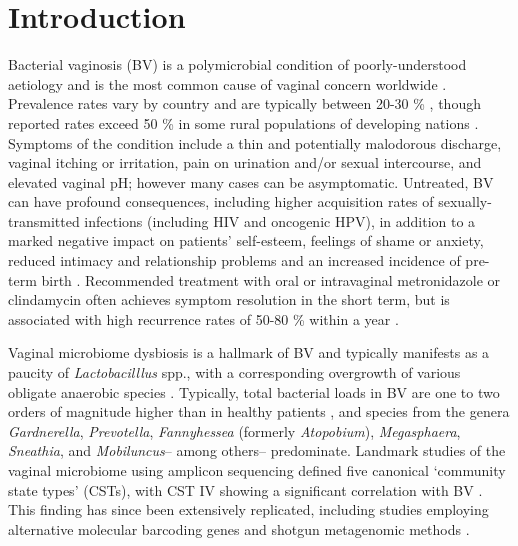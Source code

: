 \documentclass[sn-mathphys,Numbered]{sn-jnl}%
\begin{document}
\section{Introduction}\label{sec:secIntro}
Bacterial vaginosis (BV) is a polymicrobial condition of poorly-understood aetiology and is the most common cause of vaginal concern worldwide \citep{Srinivasan:2008}. Prevalence rates vary by country and are typically between 20-30 \% \citep{peebles_2019}, though reported rates exceed 50 \% in some rural populations of developing nations \citep{kenyon_global_2013}. Symptoms of the condition include a thin and potentially malodorous discharge, vaginal itching or irritation, pain on urination and/or sexual intercourse, and elevated vaginal pH; however many cases can be asymptomatic. Untreated, BV can have profound consequences, including higher acquisition rates of sexually-transmitted infections \citep{Allsworth:2011aa,Chacra:2023aa} (including HIV and oncogenic HPV), in addition to a marked negative impact on patients' self-esteem, feelings of shame or anxiety, reduced intimacy and relationship problems \citep{adolfsson_how_2016} and an increased incidence of pre-term birth \citep{Fettweis:2019aa}. Recommended treatment with oral or intravaginal metronidazole or clindamycin often achieves symptom resolution in the short term, but is associated with high recurrence rates of 50-80 \% within a year \citep{Oduyebo:2009, bradshaw_recurrence_2006}.

Vaginal microbiome dysbiosis is a hallmark of BV and typically manifests as a paucity of \textit{Lactobacilllus} spp., with a corresponding overgrowth of various obligate anaerobic species \citep{lev-sagie_vaginal_2022}. Typically, total bacterial loads in BV are one to two orders of magnitude higher than in healthy patients \citep{Zozaya:2010}, and species from the genera \textit{Gardnerella}, \textit{Prevotella}, \textit{Fannyhessea} (formerly \textit{Atopobium}\citep{nouioui_actinobacteria_2018}), \textit{Megasphaera}, \textit{Sneathia}, and \textit{Mobiluncus}-- among others-- predominate. Landmark studies of the vaginal microbiome using amplicon sequencing defined five canonical `community state types' (CSTs), with CST IV showing a significant correlation with BV \citep{Ravel:2010, france_valencia_2020}. This finding has since been extensively replicated, including studies employing alternative molecular barcoding genes \citep{albert_study_2015, dossantos_2023} and shotgun metagenomic methods \citep{symul_sub-communities_2023}.
\end{document}
